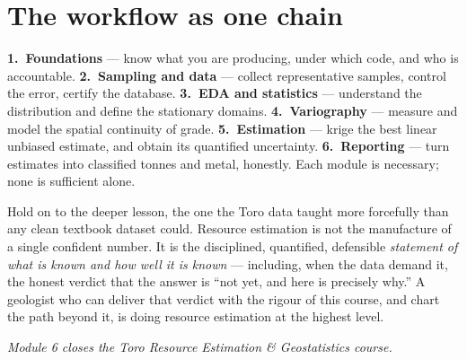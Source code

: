 \documentclass[11pt]{article}
\begin{document}
\section{The workflow as one chain}

\begin{keybox}
\textbf{1.~Foundations} --- know what you are producing, under which
code, and who is accountable. \textbf{2.~Sampling and data} --- collect
representative samples, control the error, certify the database.
\textbf{3.~EDA and statistics} --- understand the distribution and
define the stationary domains. \textbf{4.~Variography} --- measure and
model the spatial continuity of grade. \textbf{5.~Estimation} --- krige
the best linear unbiased estimate, and obtain its quantified uncertainty.
\textbf{6.~Reporting} --- turn estimates into classified tonnes and metal,
honestly. Each module is necessary; none is sufficient alone.
\end{keybox}

Hold on to the deeper lesson, the one the Toro data taught more
forcefully than any clean textbook dataset could. Resource estimation is
not the manufacture of a single confident number. It is the disciplined,
quantified, defensible \emph{statement of what is known and how well it
is known} --- including, when the data demand it, the honest verdict
that the answer is ``not yet, and here is precisely why.'' A geologist
who can deliver that verdict with the rigour of this course, and chart
the path beyond it, is doing resource estimation at the highest level.

\vspace{4pt}{\color{line}\hrule}\vspace{4pt}
{\small\itshape Module 6 closes the Toro Resource Estimation \&
Geostatistics course.}
\end{document}
